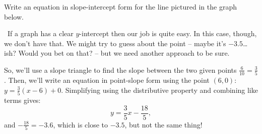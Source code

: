 \begin{boxex}
Write an equation in slope-intercept form for the line pictured in the graph below.

\begin{center}
\end{center}
%

\exsoln\ If a graph has a clear $y$-intercept then our job is quite easy. In this case, though, we don't have that. We might try to guess about the point -- maybe it's $-3.5$\ldots ish? Would you bet on that? -- but we need another approach to be sure.

So, we'll use a slope triangle to find the slope between the two given points $\frac{6}{10} = \frac{3}{5}$. Then, we'll write an equation in point-slope form using the point $(6,0)$: $y=\frac{3}{5}(x-6)+0$. Simplifying using the distributive property and combining like terms gives: \[y=\frac{3}{5}x - \frac{18}{5},\] and $-\frac{18}{5} = -3.6$, which is close to $-3.5$, but not the same thing!
\end{boxex}

